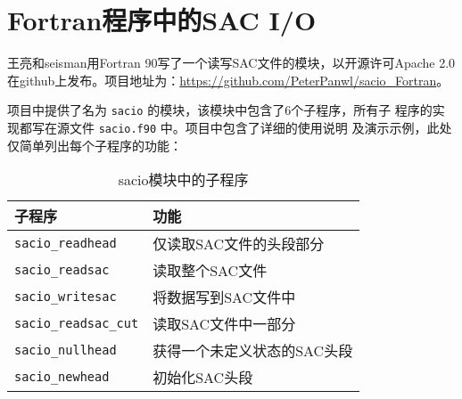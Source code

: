\section{Fortran程序中的SAC I/O}
王亮和seisman用Fortran 90写了一个读写SAC文件的模块，以开源许可Apache 2.0
在github上发布。项目地址为：\url{https://github.com/PeterPanwl/sacio_Fortran}。

项目中提供了名为 \texttt{sacio} 的模块，该模块中包含了6个子程序，所有子
程序的实现都写在源文件 \texttt{sacio.f90} 中。项目中包含了详细的使用说明
及演示示例，此处仅简单列出每个子程序的功能：

\begin{table}[H]
\centering
\caption{sacio模块中的子程序}
\label{table:sacio_Fortran}
\begin{tabular}{ll}
\toprule
子程序      &   功能        \\
\midrule
\verb|sacio_readhead|      &   仅读取SAC文件的头段部分 \\
\verb|sacio_readsac|       &   读取整个SAC文件 \\
\verb|sacio_writesac|      &   将数据写到SAC文件中 \\
\verb|sacio_readsac_cut|   &   读取SAC文件中一部分 \\
\verb|sacio_nullhead|      &   获得一个未定义状态的SAC头段\\
\verb|sacio_newhead|       &   初始化SAC头段\\
\bottomrule
\end{tabular}
\end{table}
